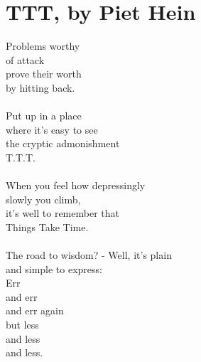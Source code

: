 \begin{appendixbox}
\label{app:ttt}
\section{TTT, by Piet Hein}
Problems worthy \\
of attack \\
prove their worth \\
by hitting back. \\
\\
Put up in a place \\
where it's easy to see \\
the cryptic admonishment\\
    T.T.T. \\
\\
When you feel how depressingly \\
slowly you climb, \\
it's well to remember that\\
Things Take Time. \\
\\
The road to wisdom? - Well, it's plain\\
and simple to express: \\
   Err \\
   and err \\
   and err again \\ 
   but less \\
   and less \\
   and less. \\

\end{appendixbox}
